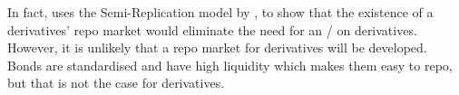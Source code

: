 \documentclass[main.tex]{subfiles}
\begin{document}
            In fact, \textcite[Section~9.4.1]{Green2015XVA}
            uses the Semi-Replication model by \textcite{BurgardKjaer2013Funding},
            to show that the existence of a derivatives' repo market
            would eliminate the need for an \FVA/ on derivatives. 
            However, it is unlikely that a repo market for derivatives will be developed.
            Bonds are standardised and have high liquidity which makes them easy to repo,
            but that is not the case for derivatives.
\end{document}
